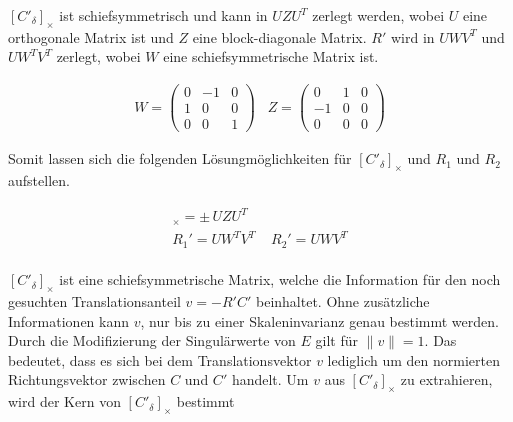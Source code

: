 $[C'_\delta]_\times$ ist schiefsymmetrisch und kann in $UZU^T$ zerlegt werden, wobei $U$ eine orthogonale Matrix ist und $Z$ eine block-diagonale Matrix\cite{HZ}. $R'$ wird in $UWV^T$ und $UW^TV^T$ zerlegt, wobei $W$ eine schiefsymmetrische Matrix ist\cite{Ferid,HZ,phdextrinsicPara}.%



\begin{gather}
W = \begin{pmatrix}
0&-1&0\\
1&0&0\\
0&0&1
\end{pmatrix} \;\;\;
Z=
\begin{pmatrix}
0&1&0\\
-1&0&0\\
0&0&0
\end{pmatrix}
\end{gather}


Somit lassen sich die folgenden Lösungmöglichkeiten für $[C'_\delta]_\times$ und $R_1$ und $R_2$ aufstellen\cite{HZ,Ferid}.


\begin{gather}
[C'_\delta]_\times = \pm \,UZU^T \\
R_1' = UW^TV^T \;\;\;\; R_2' = UWV^T
\end{gather}\\



$[C'_\delta]_\times$ ist eine schiefsymmetrische Matrix, welche die Information für den noch gesuchten Translationsanteil $v = -R'C'$ beinhaltet. Ohne zusätzliche Informationen kann $v$, nur bis zu einer Skaleninvarianz genau bestimmt werden\cite{HZ,Ferid,phdextrinsicPara}. Durch die Modifizierung der Singulärwerte von $E$ gilt für $\parallel v \parallel = 1$\cite{HZ,Ferid}. Das bedeutet, dass es sich bei dem Translationsvektor $v$ lediglich um den normierten Richtungsvektor zwischen $C$ und $C'$ handelt\cite{KIT}. Um $v$ aus $[C'_\delta]_\times$ zu extrahieren, wird der Kern von $[C'_\delta]_\times$ bestimmt

